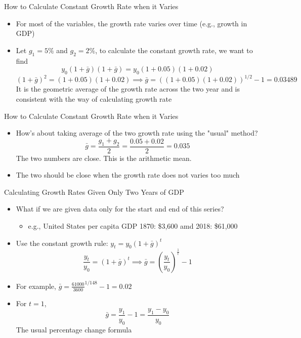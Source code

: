 \documentclass[aspectratio=1610]{beamer}
\begin{document}
\begin{frame}[wide]{How to Calculate Constant Growth Rate when it Varies}
	\begin{itemize}
		\item For most of the variables, the growth rate varies over time (e.g., growth in GDP)
		\item Let $g_1=5\%$ and $g_2=2\%$, to calculate the constant growth rate, we want to find
		\[y_0 (1+\bar{g}) (1+\bar{g}) = y_0 (1+0.05)(1+0.02)\]
		\[(1+\bar{g})^2 = (1+0.05)(1+0.02) \implies \bar{g} = \left((1+0.05)(1+0.02)\right)^{1/2} -1 = 0.03489\]
		It is the geometric average of the growth rate across the two year and is consistent with the way of calculating growth rate
	\end{itemize}
\end{frame}

\begin{frame}[wide]{How to Calculate Constant Growth Rate when it Varies}
	\begin{itemize}
		\item How's about taking average of the two growth rate using the "usual" method?
		\[\bar{g} = \frac{g_1+g_2}{2} = \frac{0.05+0.02}{2} = 0.035\]
		The two numbers are close. This is the arithmetic mean.
		\item The two should be close when the growth rate does not varies too much
	\end{itemize}
\end{frame}

\begin{frame}[wide]{Calculating Growth Rates Given Only Two Years of GDP}
	\begin{itemize}
		\item What if we are given data only for the start and end of this series?
		\begin{itemize}
			\item e.g., United States per capita GDP 1870: \$3,600 amd 2018: \$61,000
			
		\end{itemize}
		\item Use the constant growth rule: $y_t=y_0 (1+\bar{g})^t$
			\[\frac{y_t}{y_0} = (1+\bar{g})^t \implies \bar{g} = \left(\frac{y_t}{y_0}\right)^{\frac{1}{t}}-1\]
		\item For example, $\bar{g} = \frac{61000}{3600}^{1/148} - 1 = 0.02$
		\item For $t=1$, 
		\[\bar{g} = \frac{y_1}{y_0}- 1 = \frac{y_1-y_0}{y_0}\]
		The usual percentage change formula
	\end{itemize}
\end{frame}
\end{document}
